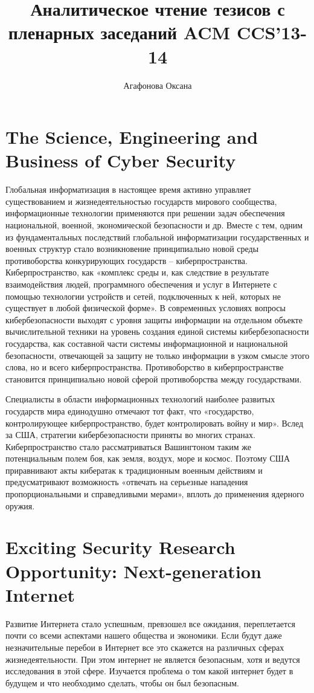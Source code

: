 \documentclass[10pt,a4paper]{article}
\author{Агафонова Оксана}
\title{Аналитическое чтение тезисов с пленарных заседаний ACM CCS'13-14}
\begin{document}
\maketitle
\clearpage
\tableofcontents
\clearpage
\section{The Science, Engineering and Business of Cyber Security}
\hspace{0,6cm}Глобальная информатизация в настоящее время активно управляет существованием и жизнедеятельностью государств мирового сообщества, информационные технологии применяются при решении задач обеспечения национальной, военной, экономической безопасности и др. Вместе с тем, одним из фундаментальных последствий глобальной информатизации государственных и военных структур стало возникновение принципиально новой среды противоборства конкурирующих государств – киберпространства. Киберпространство, как «комплекс среды и, как следствие в результате взаимодействия людей, программного обеспечения и услуг в Интернете с помощью технологии устройств и сетей, подключенных к ней, которых не существует в любой физической форме». В современных условиях вопросы кибербезопасности выходят с уровня защиты информации на отдельном объекте вычислительной техники на уровень создания единой системы кибербезопасности государства, как составной части системы информационной и национальной безопасности, отвечающей за защиту не только информации в узком смысле этого слова, но и всего киберпространства.  Противоборство в киберпространстве становится принципиально новой сферой противоборства между государствами. 

Специалисты в области информационных технологий наиболее развитых государств мира единодушно отмечают тот факт, что «государство, контролирующее киберпространство, будет контролировать войну и мир». Вслед за США, стратегии кибербезопасности приняты во многих странах. Киберпространство стало рассматриваться Вашингтоном таким же потенциальным полем боя, как земля, воздух, море и космос. Поэтому США приравнивают акты кибератак к традиционным военным действиям и предусматривают возможность «отвечать на серьезные нападения пропорциональными и справедливыми мерами», вплоть до применения ядерного  оружия.

\section{Exciting Security Research Opportunity: Next-generation Internet}
\hspace{0,6cm}Развитие Интернета стало успешным, превзошел все ожидания, переплетается почти со всеми  аспектами нашего общества и экономики.  Если будут даже незначительные перебои в Интернет все это скажется на различных сферах жизнедеятельности. При этом интернет не является безопасным, хотя и ведутся исследования в этой сфере. Изучается проблема о том какой интернет будет в будущем и что необходимо сделать, чтобы он был безопасным.
\end{document}
